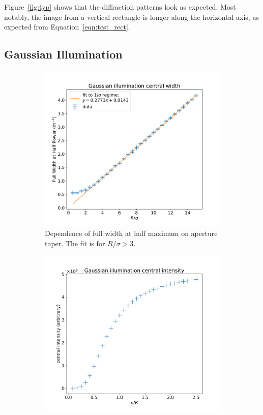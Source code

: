 \documentclass{article}
\begin{document}
Figure~\ref{fig:typ} shows that the diffraction patterns look as expected. Most notably, the image from a vertical rectangle is longer along the horizontal axis, as expected from Equation~\ref{eqn:test_rect}.

\subsection{Gaussian Illumination}\label{sec:res:gauss}
\begin{figure}
    \centering
    \begin{subfigure}{0.49\textwidth}
        \centering
        \includegraphics[width=\textwidth]{pictures/gauss/size.pdf}
        \caption{Dependence of full width at half maximum on aperture taper. The fit is for $R/\sigma > 3$.}\label{fig:gauss:size}
    \end{subfigure}%
    \hfill
    \begin{subfigure}{0.49\textwidth}
        \centering
        \includegraphics[width=\textwidth]{pictures/gauss/int.pdf}

\end{subfigure}
\end{figure}
\end{document}
